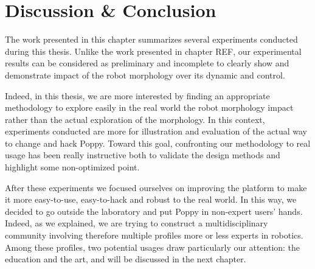 

% 



\section{Discussion \& Conclusion } %

The work presented in this chapter summarizes several experiments conducted during this thesis.
Unlike the work presented in chapter REF, our experimental results can be considered as preliminary and incomplete to clearly show and demonstrate impact of the robot morphology over its dynamic and control.

Indeed, in this thesis, we are more interested by finding an appropriate methodology to explore easily in the real world the robot morphology impact rather than the actual exploration of the morphology. In this context, experiments conducted are more for illustration and evaluation of the actual way to change and hack Poppy. Toward this goal, confronting our methodology to real usage has been really instructive both to validate the design methods and highlight some non-optimized point.

After these experiments we focused ourselves on improving the platform to make it more easy-to-use, easy-to-hack and robust to the real world. In this way, we decided to go outside the laboratory and put Poppy in non-expert users' hands. Indeed, as we explained, we are trying to construct a multidisciplinary community involving therefore multiple profiles more or less experts in robotics. Among these profiles, two potential usages draw particularly our attention: the education and the art, and will be discussed in the next chapter.


